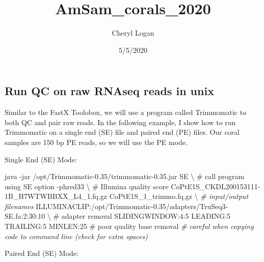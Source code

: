 \documentclass[]{article}
\title{AmSam\_corals\_2020}
\author{Cheryl Logan}
\date{5/5/2020}
\newenvironment{Shaded}{\begin{snugshade}}{\end{snugshade}}
\newcommand{\CommentTok}[1]{\textcolor[rgb]{0.56,0.35,0.01}{\textit{#1}}}
\newcommand{\DataTypeTok}[1]{\textcolor[rgb]{0.13,0.29,0.53}{#1}}
\newcommand{\ExtensionTok}[1]{#1}
\newcommand{\NormalTok}[1]{#1}
\begin{document}
\maketitle

\hypertarget{run-qc-on-raw-rnaseq-reads-in-unix}{%
\subsection{Run QC on raw RNAseq reads in
unix}\label{run-qc-on-raw-rnaseq-reads-in-unix}}

Similar to the FastX Toolobox, we will use a program called Trimmomatic
to both QC and pair raw reads. In the following example, I show how to
run Trimmomatic on a single end (SE) file and paired end (PE) files. Our
coral samples are 150 bp PE reads, so we will use the PE mode.

Single End (SE) Mode:

\begin{Shaded}
\begin{Highlighting}[]

\ExtensionTok{java}\NormalTok{ -jar /opt/Trimmomatic-0.35/trimmomatic-0.35.jar SE }\DataTypeTok{\textbackslash{} }\NormalTok{          # call program using SE option}
\ExtensionTok{-phred33} \DataTypeTok{\textbackslash{} }\NormalTok{                                                             # Illumina quality score}
\ExtensionTok{CoPtE1S_CKDL200153111-1B_H7WTWBBXX_L4_1.fq.gz}\NormalTok{ CoPtE1S_1_trimmo.fq.gz }\DataTypeTok{\textbackslash{} } \CommentTok{# input/output filenames}
\ExtensionTok{ILLUMINACLIP}\NormalTok{:/opt/Trimmomatic-0.35/adapters/TruSeq3-SE.fa:2:30:10 }\DataTypeTok{\textbackslash{} }\NormalTok{    # adapter removal}
\ExtensionTok{SLIDINGWINDOW}\NormalTok{:4:5 LEADING:5 TRAILING:5 MINLEN:25                        # poor quality base removal}
\CommentTok{# careful when copying code to command line (check for extra spaces)}
\end{Highlighting}
\end{Shaded}

Paired End (SE) Mode:
\end{document}
